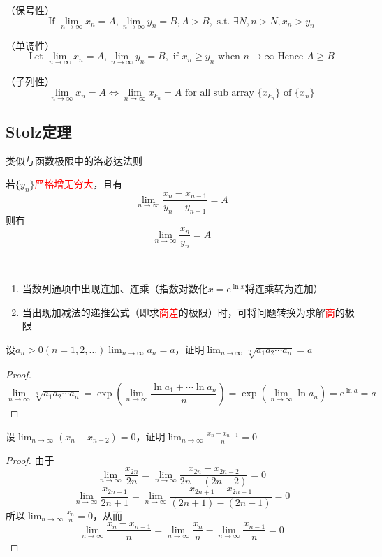 \begin{theorem}
    \label{th:数列极限保号性}
    （保号性）
    \[
        \text{If } \lim_{n\to\infty} x_n = A, \lim_{n\to\infty} y_n = B, A>B,
        \text{ s.t. } \exists N, n > N, x_n > y_n
    \]
\end{theorem}
\begin{theorem}
    \label{th:数列极限单调性}
    （单调性）
    \[
        \text{Let } \lim_{n\to\infty} x_n = A, \lim_{n\to\infty} y_n = B,
        \text{ if } x_n \geq y_n \text{ when } n\to\infty
        \text{ Hence } A \geq B
    \]
\end{theorem}
\begin{theorem}
    \label{th:数列极限子列性}
    （子列性）
    \[
        \lim_{n\to\infty} x_n = A \iff \lim_{n\to\infty} x_{k_n} = A \text{ for all sub array } \{x_{k_n}\} \text{ of } \{x_n\}
    \]
\end{theorem}

\subsection{Stolz定理}
类似与函数极限中的洛必达法则
\begin{theorem}
    \label{th:Stolz定理}
    若$\{y_n\}$\textcolor{red}{严格增无穷大}，且有
    \[ \lim_{n\to\infty}\frac{x_n - x_{n-1}}{y_n - y_{n-1}} = A \]
    则有
    \[ \lim_{n\to\infty}\frac{x_n}{y_n} = A \]
\end{theorem}
\begin{situation}
    ~
    \begin{enumerate}
        \item 当数列通项中出现连加、连乘（指数对数化$x = \mathrm{e}^{\ln x}$将连乘转为连加）
        \item 当出现加减法的递推公式（即求\textcolor{red}{商差}的极限）时，可将问题转换为求解\textcolor{red}{商}的极限
    \end{enumerate}
\end{situation}
\begin{example}
    设$a_n>0 (n = 1, 2, \ldots) \lim_{n\to\infty}a_n = a$，证明$\lim_{n\to\infty}\sqrt[n]{a_1a_2\cdots a_n}=a$
\end{example}
\begin{proof}
    \[
        \lim_{n\to\infty} \sqrt[n]{a_1a_2\cdots a_n}
        =\exp(\lim_{n\to\infty}\frac{\ln a_1 + \cdots \ln a_n}{n})
        =\exp(\lim_{n\to\infty}\ln a_n) = \mathrm{e}^{\ln a} = a
    \]
\end{proof}
\begin{example}
    设$\lim_{n\to\infty}(x_n - x_{n-2}) = 0$，证明$\lim_{n\to\infty}\frac{x_n - x_{n-1}}{n} = 0$
\end{example}
\begin{proof}
    由于
    \[ \lim_{n\to\infty}\frac{x_{2n}}{2n} = \lim_{n\to\infty}\frac{x_{2n}-x_{2n-2}}{2n-(2n-2)} = 0 \]
    \[ \lim_{n\to\infty}\frac{x_{2n+1}}{2n+1} = \lim_{n\to\infty}\frac{x_{2n+1}-x_{2n-1}}{(2n+1)-(2n-1)} = 0 \]
    所以$\lim_{n\to\infty} \frac{x_n}{n} = 0$，从而
    \[ \lim_{n\to\infty}\frac{x_n - x_{n-1}}{n} = \lim_{n\to\infty}\frac{x_n}{n} - \lim_{n\to\infty}\frac{x_{n-1}}{n} = 0 \]
\end{proof}

